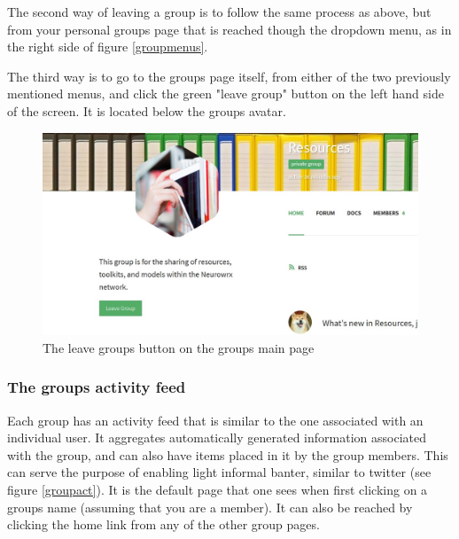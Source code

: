 \documentclass[10pt]{article}
\begin{document}
\begin{flushleft}
The second way of leaving a group is to follow the same process as above, but from your personal groups page that is reached though the dropdown menu, as in the right side of figure \ref{groupmenus}.
\end{flushleft}

\begin{flushleft}
The third way is to go to the groups page itself, from either of the two previously mentioned menus, and click the green "leave group" button on the left hand side of the screen.  It is located below the groups avatar.  
\end{flushleft}

\begin{figure}[h]
    \centering
    \includegraphics[scale=0.3]{images/leavegroup.jpg}
    \caption{The leave groups button on the groups main page}
    \label{leavegroup}
\end{figure}

\subsubsection{The groups activity feed}

\begin{flushleft}
Each group has an activity feed that is similar to the one associated with an individual user.  It aggregates automatically generated information associated with the group, and can also have items placed in it by the group members.  This can serve the purpose of enabling light informal banter, similar to twitter (see figure \ref{groupact}).  It is the default page that one sees when first clicking on a groups name (assuming that you are a member).  It can also be reached by clicking the home link from any of the other group pages. 
\end{flushleft}
\end{document}
